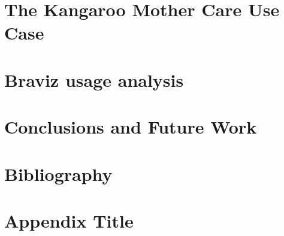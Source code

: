 \documentclass[12pt]{report}
\begin{document}
\chapter{The Kangaroo Mother Care Use Case}
\label{chap_kmc}


\chapter{Braviz usage analysis}
\label{chap_analysis}


\chapter{Conclusions and Future Work}
\label{chap_conclusions}
%

\chapter*{Bibliography}


\printbibliography

\appendix
\chapter{Appendix Title}
%
\end{document}
